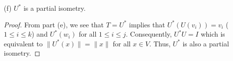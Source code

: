 \begin{enumerate}
\begin{proof}
        \[  \langle U({w}_{i}) , {w}_{\ell} \rangle = \langle {w}_{i} ,  T({w}_{\ell}) \rangle. \]
        Next, consider \( \langle U(U(v_{i})) , {w}_{k} \rangle  \). Similarly to the last case, we define another function \( \sigma(U({v}_{i})) = \langle U({v}_{i}) , T({w}_{\ell}) \rangle  \) with \( T({w}_{\ell}) \) being a unique vector in \( V  \). Then we have
        \[  \langle U(U({v}_{i})) , {w}_{\ell} \rangle = \langle U({v}_{i}) , T({w}_{\ell}) \rangle. \]
        Finally, consider \( \langle U({w}_{i}) , U({v}_{\ell}) \rangle \). Using Theorem 6.18 and definition of \( T  \), we have 
        \[  \langle U({w}_{i}) , U({v}_{\ell}) \rangle = \langle {w}_{i} ,  {v}_{\ell} \rangle = \langle {w}_{i} ,  T(U({v}_{\ell})) \rangle. \]
        Thus, for any \( x,y \in \beta  \) we get that \( \langle U(x) , y \rangle = \langle x  , T(y) \rangle \) with \( T = U^{*} \).
        \end{proof}
    \item[(f)] \( U^{*} \) is a partial isometry.
        \begin{proof}
            From part (e), we see that \( T = U^{*} \) implies that \( U^{*}(U({v}_{i})) = {v}_{i}  \) (\( 1 \leq i \leq k  \)) and \( U^{*}({w}_{i}) \) for all \( 1 \leq i \leq j   \). Consequently, \( U^{*}U = I   \) which is equivalent to \( \|U^{*}(x)\| = \|x\| \) for all \( x \in V  \). Thus, \( U^{*} \) is also a partial isometry.   
        \end{proof}
\end{enumerate}

